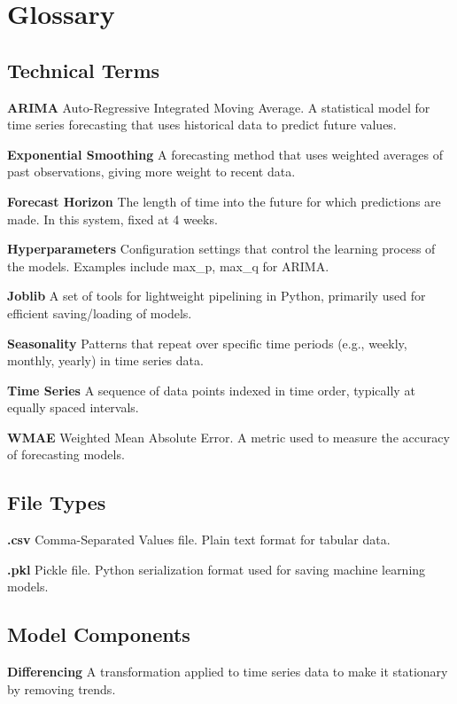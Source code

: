 \chapter{Glossary}

\section{Technical Terms}

\textbf{ARIMA}
Auto-Regressive Integrated Moving Average. A statistical model for time series forecasting that uses historical data to predict future values.

\textbf{Exponential Smoothing}
A forecasting method that uses weighted averages of past observations, giving more weight to recent data.

\textbf{Forecast Horizon}
The length of time into the future for which predictions are made. In this system, fixed at 4 weeks.

\textbf{Hyperparameters}
Configuration settings that control the learning process of the models. Examples include max\_p, max\_q for ARIMA.

\textbf{Joblib}
A set of tools for lightweight pipelining in Python, primarily used for efficient saving/loading of models.

\textbf{Seasonality}
Patterns that repeat over specific time periods (e.g., weekly, monthly, yearly) in time series data.

\textbf{Time Series}
A sequence of data points indexed in time order, typically at equally spaced intervals.

\textbf{WMAE}
Weighted Mean Absolute Error. A metric used to measure the accuracy of forecasting models.

\section{File Types}

\textbf{.csv}
Comma-Separated Values file. Plain text format for tabular data.

\textbf{.pkl}
Pickle file. Python serialization format used for saving machine learning models.

\section{Model Components}

\textbf{Differencing}
A transformation applied to time series data to make it stationary by removing trends.

